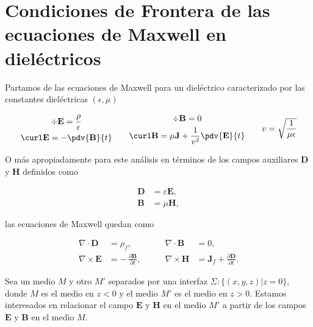 \section{Condiciones de Frontera de las ecuaciones de Maxwell en dieléctricos}

\begin{figure}[h!]
    \centering
\end{figure}

Partamos de las ecuaciones de Maxwell para un dieléctrico caracterizado por 
las constantes dieléctricas $(\epsilon, \mu)$ 

\begin{equation}
    \begin{gathered}
        \div \mathbf{E} = \frac{\rho}{\epsilon} \\
        \curl \mathbf{E} = -\pdv{\mathbf{B}}{t}
    \end{gathered}
    \qquad
    \begin{gathered}
        \div \mathbf{B} = 0 \\
        \curl \mathbf{B} = \mu \mathbf{J} + \frac{1}{v^2}\pdv{\mathbf{E}}{t}
    \end{gathered}
    \qquad
    v = \sqrt{\frac{1}{\mu\epsilon}}
    \label{eq:maxwell_dielectric_basic}
\end{equation}

O más apropiadamente para este análisis en términos de los campos auxiliares $\mathbf D$ y $\mathbf H$ definidos como 

\begin{align}
\mathbf{D} &= \varepsilon \mathbf{E}, \\[6pt]
\mathbf{B} &= \mu \mathbf{H},
\end{align}

las ecuaciones de Maxwell quedan como 

\begin{align}
\nabla \cdot \mathbf{D} &= \rho_f, 
&\qquad \nabla \cdot \mathbf{B} &= 0, \\[6pt]
\nabla \times \mathbf{E} &= -\,\frac{\partial \mathbf{B}}{\partial t}, 
&\qquad \nabla \times \mathbf{H} &= \mathbf{J}_f + \frac{\partial \mathbf{D}}{\partial t}.
\label{eq:maxwell_aux_dielectric}
\end{align}

Sea un medio $M$ y otro $M'$ separados por una interfaz $\Sigma: \{ (x,y,z) | z=0 \}$, donde $M$ es el medio en $z<0$ y el medio $M'$ es el medio en $z>0$. Estamos interesados en relacionar el campo $\mathbf{E}$ y $\mathbf{H}$ en el medio $M'$ a partir de los campos $\mathbf{E}$ y $\mathbf{B}$ en el medio $M$. 

